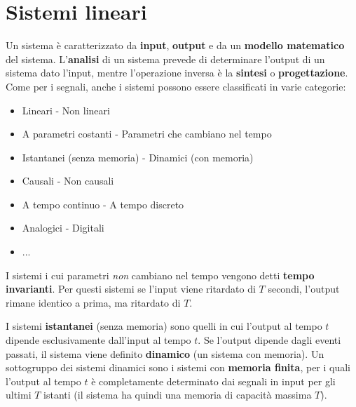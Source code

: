 \documentclass[a4paper, titlepage, oneside]{scrbook}
\begin{document}
\section{Sistemi lineari}
Un sistema è caratterizzato da \textbf{input}, \textbf{output} e da un \textbf{modello matematico} del sistema. L'\textbf{analisi} di un sistema prevede di determinare l'output di un sistema dato l'input, mentre l'operazione inversa è la \textbf{sintesi} o \textbf{progettazione}.
Come per i segnali, anche i sistemi possono essere classificati in varie categorie:
\begin{itemize}
	\item Lineari - Non lineari
	\item A parametri costanti - Parametri che cambiano nel tempo
	\item Istantanei (senza memoria) - Dinamici (con memoria)
	\item Causali - Non causali
	\item A tempo continuo - A tempo discreto
	\item Analogici - Digitali
	\item ...
\end{itemize}
I sistemi i cui parametri \textit{non} cambiano nel tempo vengono detti \textbf{tempo invarianti}.
Per questi sistemi se l'input viene ritardato di $T$ secondi, l'output rimane identico a prima, ma ritardato di $T$.

I sistemi \textbf{istantanei} (senza memoria) sono quelli in cui l'output al tempo $t$ dipende esclusivamente dall'input al tempo $t$.
Se l'output dipende dagli eventi passati, il sistema viene definito \textbf{dinamico} (un sistema con memoria).
Un sottogruppo dei sistemi dinamici sono i sistemi con \textbf{memoria finita}, per i quali l'output al tempo $t$ è completamente determinato
dai segnali in input per gli ultimi $T$ istanti (il sistema ha quindi una memoria di capacità massima $T$).
\begin{figure}[h]
	\centering
	\label{fig:lineare_vs_nonlineare}
\end{figure}
\end{document}
